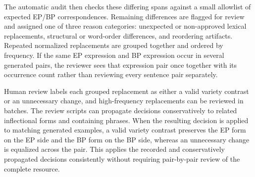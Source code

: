 The automatic audit then checks these differing spans against a small allowlist
of expected EP/BP correspondences. Remaining differences are flagged for review
and assigned one of three reason categories: unexpected or non-approved lexical
replacements, structural or word-order differences, and reordering artifacts.
Repeated normalized replacements are grouped together and ordered by frequency.
If the same EP expression and BP expression occur in several generated pairs,
the reviewer sees that expression pair once together with its occurrence count
rather than reviewing every sentence pair separately.

Human review labels each grouped replacement as either a valid variety contrast
or an unnecessary change, and high-frequency replacements can be reviewed in
batches. The review scripts can propagate decisions conservatively to related
inflectional forms and containing phrases. When the resulting decision is
applied to matching generated examples, a valid variety contrast preserves the
EP form on the EP side and the BP form on the BP side, whereas an unnecessary
change is equalized across the pair. This applies the recorded and conservatively
propagated decisions consistently without requiring pair-by-pair review of the
complete resource.
